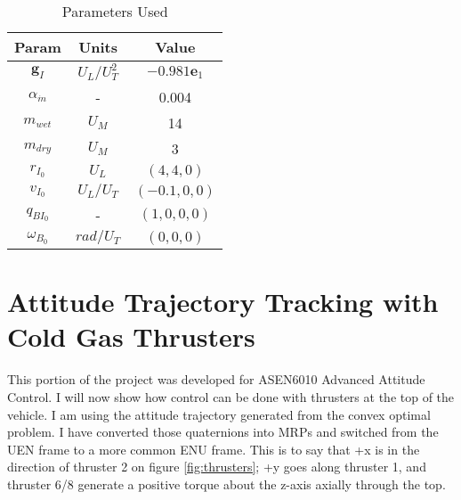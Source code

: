 \begin{table}[ht]
\caption{Parameters Used}
\centering 
\begin{tabular}{c c c} 
\hline\hline
Param & Units & Value \\ [0.5ex] 
\hline 
$\mathbf{g}_I$ 		& $U_L/U_T^2$ 	& $-0.981\mathbf{e}_1$ 		\\ 
$\alpha_{\dot{m}}$ 	& - 			& 0.004 							\\
$m_{wet}$ 			& $U_M$ 		& 14		 					\\
$m_{dry}$ 			& $U_M$ 		& 3  						\\
$r_{I_0}$ 			& $U_L$ 		& $(4,4,0)$ 							\\
$v_{I_0}$ 			& $U_L/U_T$	 	& $(-0.1,0,0)$ 							\\
$q_{{BI}_0}$ 		& - 			& $(1,0,0,0)$ 							\\
$\omega_{B_0}$ 		& $rad/U_T$ 			& $(0,0,0)$ 							\\[1ex] 
\hline
\end{tabular}
\label{table:nonlin}
\end{table}




\section{Attitude Trajectory Tracking with Cold Gas Thrusters}
This portion of the project was developed for ASEN6010 Advanced Attitude Control. I will now show how control can be done with thrusters at the top of the vehicle. I am using the attitude trajectory generated from the convex optimal problem. I have converted those quaternions into MRPs and switched from the UEN frame to a more common ENU frame. This is to say that +x is in the direction of thruster 2 on figure \ref{fig:thrusters}; +y goes along thruster 1, and thruster 6/8 generate a positive torque about the z-axis axially through the top.

